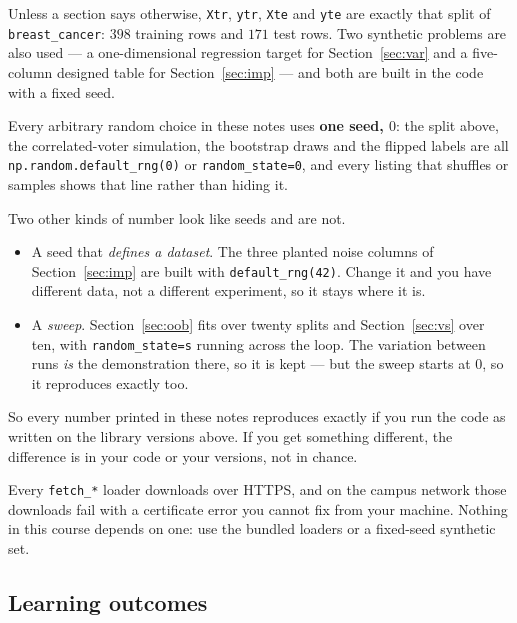 \documentclass[11pt]{article}
\begin{document}
Unless a section says otherwise, \texttt{Xtr}, \texttt{ytr}, \texttt{Xte} and
\texttt{yte} are exactly that split of \texttt{breast\_cancer}: $398$ training
rows and $171$ test rows. Two synthetic problems are also used --- a
one-dimensional regression target for Section~\ref{sec:var} and a five-column
designed table for Section~\ref{sec:imp} --- and both are built in the code
with a fixed seed.

\begin{keyidea}
Every arbitrary random choice in these notes uses \textbf{one seed, $0$}: the
split above, the correlated-voter simulation, the bootstrap draws and the
flipped labels are all \texttt{np.random.default\_rng(0)} or
\texttt{random\_state=0}, and every listing that shuffles or samples shows
that line rather than hiding it.

Two other kinds of number look like seeds and are not.
\begin{itemize}
  \item A seed that \emph{defines a dataset}. The three planted noise columns
    of Section~\ref{sec:imp} are built with \texttt{default\_rng(42)}. Change
    it and you have different data, not a different experiment, so it stays
    where it is.
  \item A \emph{sweep}. Section~\ref{sec:oob} fits over twenty splits and
    Section~\ref{sec:vs} over ten, with \texttt{random\_state=s} running
    across the loop. The variation between runs \emph{is} the demonstration
    there, so it is kept --- but the sweep starts at $0$, so it reproduces
    exactly too.
\end{itemize}

So every number printed in these notes reproduces exactly if you run the code
as written on the library versions above. If you get something different, the
difference is in your code or your versions, not in chance.
\end{keyidea}

\begin{caution}
Every \texttt{fetch\_*} loader downloads over HTTPS, and on the campus network
those downloads fail with a certificate error you cannot fix from your machine.
Nothing in this course depends on one: use the bundled loaders or a
fixed-seed synthetic set.
\end{caution}

\subsection{Learning outcomes}
\end{document}
